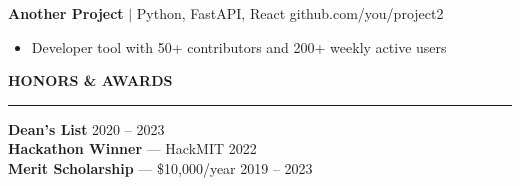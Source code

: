 \documentclass[a4paper]{article}
\begin{document}
\begin{minipage}[t]{0.65\textwidth}
\vspace{6pt}
\textbf{Another Project} {\footnotesize $|$ Python, FastAPI, React} \hfill {\footnotesize \color{gray} github.com/you/project2} \\
\begin{itemize}[leftmargin=1.2em, noitemsep, topsep=2pt]
  \item {\footnotesize Developer tool with 50+ contributors and 200+ weekly active users}
\end{itemize}

\vspace{10pt}
{\small \textbf{HONORS \& AWARDS}}
\noindent\rule{0.95\textwidth}{0.3pt}

\vspace{4pt}
{\footnotesize
\textbf{Dean's List} \hfill 2020 -- 2023 \\
\textbf{Hackathon Winner} — HackMIT \hfill 2022 \\
\textbf{Merit Scholarship} — \$10,000/year \hfill 2019 -- 2023
}

\end{minipage}
\end{document}
